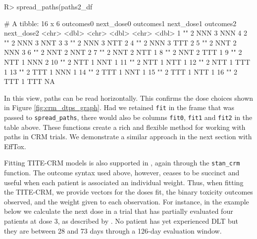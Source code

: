 \documentclass[article]{jss}
\begin{document}
\begin{CodeChunk}

\begin{CodeInput}
R> spread_paths(paths2_df %
\end{CodeInput}

\begin{CodeOutput}
# A tibble: 16 x 6
   outcomes0 next_dose0 outcomes1 next_dose1 outcomes2 next_dose2
   <chr>          <dbl> <chr>          <dbl> <chr>          <dbl>
 1 ""                 2 NNN                3 NNN                4
 2 ""                 2 NNN                3 NNT                3
 3 ""                 2 NNN                3 NTT                2
 4 ""                 2 NNN                3 TTT                2
 5 ""                 2 NNT                2 NNN                3
 6 ""                 2 NNT                2 NNT                2
 7 ""                 2 NNT                2 NTT                1
 8 ""                 2 NNT                2 TTT                1
 9 ""                 2 NTT                1 NNN                2
10 ""                 2 NTT                1 NNT                1
11 ""                 2 NTT                1 NTT                1
12 ""                 2 NTT                1 TTT                1
13 ""                 2 TTT                1 NNN                1
14 ""                 2 TTT                1 NNT                1
15 ""                 2 TTT                1 NTT                1
16 ""                 2 TTT                1 TTT               NA
\end{CodeOutput}
\end{CodeChunk}

In this view, paths can be read horizontally. This confirms the dose
choices shown in Figure \ref{fig:crm_dtps_graph}. Had we retained
\texttt{fit} in the frame that was passed to \texttt{spread\_paths},
there would also be columns \texttt{fit0}, \texttt{fit1} and
\texttt{fit2} in the table above. These functions create a rich and
flexible method for working with paths in CRM trials. We demonstrate a
similar approach in the next section with EffTox.

Fitting TITE-CRM models is also supported in , again through
the \texttt{stan\_crm} function. The outcome syntax used above, however,
ceases to be succinct and useful when each patient is associated an
individual weight. Thus, when fitting the TITE-CRM, we provide vectors
for the doses fit, the binary toxicity outcomes observed, and the weight
given to each observation. For instance, in the example below we
calculate the next dose in a trial that has partially evaluated four
patients at dose 3, as described by \citet[p.124]{Cheung2011}. No
patient has yet experienced DLT but they are between 28 and 73 days
through a 126-day evaluation window.
\end{document}
